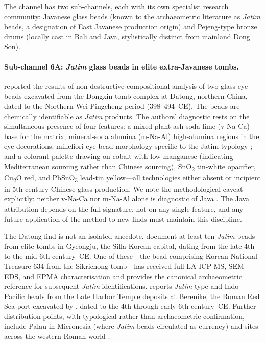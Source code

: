 \documentclass[12pt,a4paper]{article}
\begin{document}
The channel has two sub-channels, each with its own specialist research community: Javanese glass beads (known to the archaeometric literature as \textit{Jatim} beads, a designation of East Javanese production origin) and Pejeng-type bronze drums (locally cast in Bali and Java, stylistically distinct from mainland Dong Son).

\paragraph{Sub-channel 6A: \textit{Jatim} glass beads in elite extra-Javanese tombs.} \citet{jia_etal_2024} reported the results of non-destructive compositional analysis of two glass eye-beads excavated from the Dongxin tomb complex at Datong, northern China, dated to the Northern Wei Pingcheng period (398--494~CE). The beads are chemically identifiable as \textit{Jatim} products. The authors' diagnostic rests on the simultaneous presence of four features: a mixed plant-ash soda-lime (v-Na-Ca) base for the matrix; mineral-soda alumina (m-Na-Al) high-alumina regions in the eye decorations; millefiori eye-bead morphology specific to the Jatim typology \citep{lankton2008}; and a colorant palette drawing on cobalt with low manganese (indicating Mediterranean sourcing rather than Chinese sourcing), SnO\textsubscript{2} tin-white opacifier, Cu\textsubscript{2}O red, and PbSnO\textsubscript{3} lead-tin yellow---all technologies either absent or incipient in 5th-century Chinese glass production. We note the methodological caveat explicitly: neither v-Na-Ca nor m-Na-Al alone is diagnostic of Java \citep{jia_etal_2025,wang_etal_2023}. The Java attribution depends on the full signature, not on any single feature, and any future application of the method to new finds must maintain this discipline.

The Datong find is not an isolated anecdote. \citet{lankton_bernbaum} document at least ten \textit{Jatim} beads from elite tombs in Gyeongju, the Silla Korean capital, dating from the late 4th to the mid-6th century~CE. One of these---the bead comprising Korean National Treasure 634 from the Sikrichong tomb---has received full LA-ICP-MS, SEM-EDS, and EPMA characterisation and provides the canonical archaeometric reference for subsequent \textit{Jatim} identifications. \citet{then2014} reports \textit{Jatim}-type and Indo-Pacific beads from the Late Harbor Temple deposits at Berenike, the Roman Red Sea port excavated by \citet{sidebotham2011}, dated to the 4th through early 6th century~CE. Further distribution points, with typological rather than archaeometric confirmation, include Palau in Micronesia (where \textit{Jatim} beads circulated as currency) and sites across the western Roman world \citep{green2018}.
\end{document}

